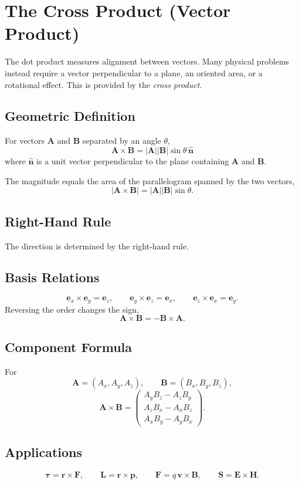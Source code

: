 
\section{The Cross Product (Vector Product)}
The dot product measures alignment between vectors. Many physical problems instead require a vector perpendicular to a plane, an oriented area, or a rotational effect. This is provided by the \emph{cross product}.

\subsection{Geometric Definition}
For vectors $\mathbf A$ and $\mathbf B$ separated by an angle $\theta$,
\[
\boxed{\mathbf A\times\mathbf B=|\mathbf A||\mathbf B|\sin\theta\,\hat{\mathbf n}}
\]
where $\hat{\mathbf n}$ is a unit vector perpendicular to the plane containing $\mathbf A$ and $\mathbf B$.

The magnitude equals the area of the parallelogram spanned by the two vectors,
\[
|\mathbf A\times\mathbf B|=|\mathbf A||\mathbf B|\sin\theta.
\]

\subsection{Right-Hand Rule}
The direction is determined by the right-hand rule.

\subsection{Basis Relations}
\[
\mathbf e_x\times\mathbf e_y=\mathbf e_z,\qquad
\mathbf e_y\times\mathbf e_z=\mathbf e_x,\qquad
\mathbf e_z\times\mathbf e_x=\mathbf e_y.
\]
Reversing the order changes the sign,
\[
\mathbf A\times\mathbf B=-\mathbf B\times\mathbf A.
\]

\subsection{Component Formula}
For
\[
\mathbf A=(A_x,A_y,A_z),\qquad
\mathbf B=(B_x,B_y,B_z),
\]
\[
\mathbf A\times\mathbf B=
\begin{pmatrix}
A_yB_z-A_zB_y\\
A_zB_x-A_xB_z\\
A_xB_y-A_yB_x
\end{pmatrix}.
\]

\subsection{Applications}
\[
\boldsymbol\tau=\mathbf r\times\mathbf F,\qquad
\mathbf L=\mathbf r\times\mathbf p,\qquad
\mathbf F=q\,\mathbf v\times\mathbf B,\qquad
\mathbf S=\mathbf E\times\mathbf H.
\]

